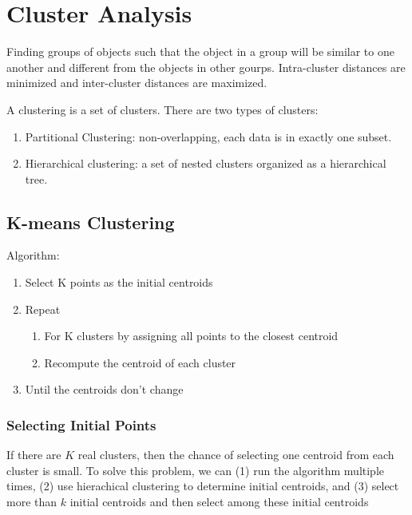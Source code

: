 \chapter{Cluster Analysis}

\begin{multicols*}{2}

\noindent Finding groups of objects such that the object in a group will be similar to one another and different from the objects in other gourps. Intra-cluster distances are minimized and inter-cluster distances are maximized. 

\noindent A clustering is a set of clusters. There are two types of clusters:

\begin{enumerate}
    \item Partitional Clustering: non-overlapping, each data is in exactly one subset.
    \item Hierarchical clustering: a set of nested clusters organized as a hierarchical tree. 
\end{enumerate}

\section{K-means Clustering}

\noindent Algorithm:

\begin{enumerate}
    \item Select K points as the initial centroids
    \item Repeat
    \begin{enumerate}
        \item For K clusters by assigning all points to the closest centroid
        \item Recompute the centroid of each cluster
    \end{enumerate}
    \item Until the centroids don't change
\end{enumerate}

\subsection{Selecting Initial Points}

\noindent If there are $K$ real clusters, then the chance of selecting one centroid from each cluster is small. To solve this problem, we can (1) run the algorithm multiple times, (2) use hierachical clustering to determine initial centroids, and (3) select more than $k$ initial centroids and then select among these initial centroids


\end{multicols*}
